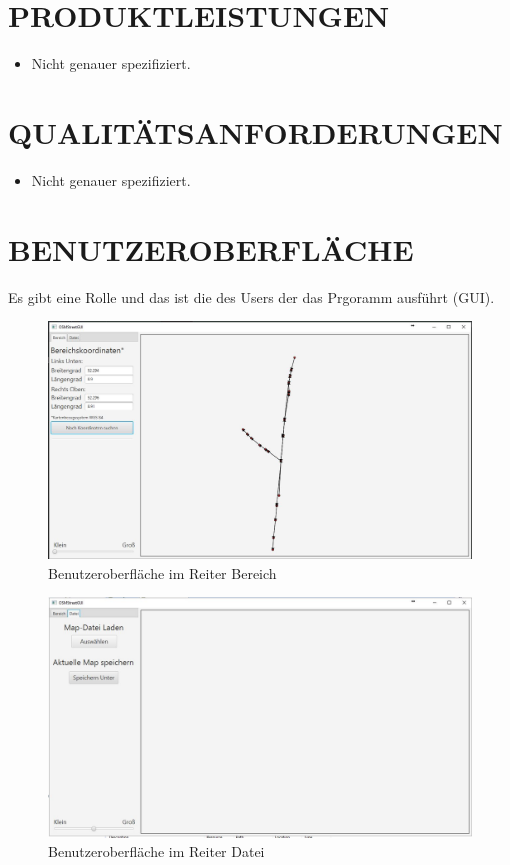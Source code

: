 	\section{\Large PRODUKTLEISTUNGEN}
	\begin{itemize}
		\item Nicht genauer spezifiziert.
	\end{itemize} 
		
	\section{\Large QUALITÄTSANFORDERUNGEN}
	\begin{itemize}
		\item Nicht genauer spezifiziert.
	\end{itemize}
	
	\section{\Large BENUTZEROBERFLÄCHE}
	Es gibt eine Rolle und das ist die des Users der das Prgoramm ausführt (GUI).
	\begin{figure}[H]
	\centering
	\includegraphics[width=0.7\linewidth]{images/BereichReiter}
	\caption{Benutzeroberfläche im Reiter Bereich}
	\label{fig:GUI}
	\end{figure}
	
	\begin{figure}[H]
	\centering
	\includegraphics[width=0.7\linewidth]{images/DateiReiter}
	\caption{Benutzeroberfläche im Reiter Datei}
	\label{fig:GUI2}
	\end{figure}
	
